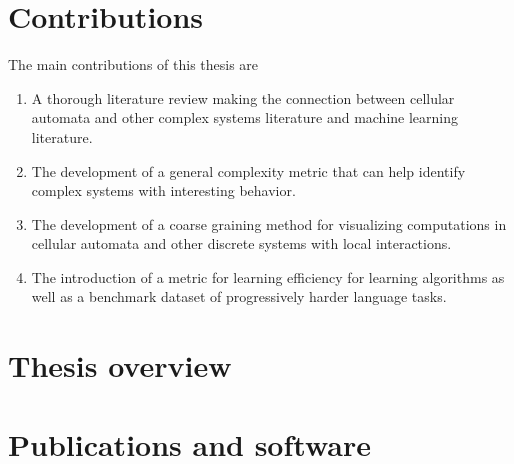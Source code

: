 \section{Contributions}

The main contributions of this thesis are
\begin{enumerate}
  \item A thorough literature review making the connection between cellular
        automata and other complex systems literature and machine learning
        literature.

  \item The development of a general complexity metric that can help identify
  complex systems with interesting behavior.

  \item The development of a coarse graining method for visualizing computations
        in cellular automata and other discrete systems with local interactions.

  \item The introduction of a metric for learning efficiency for learning
        algorithms as well as a benchmark dataset of progressively harder
        language tasks.
\end{enumerate}

\section{Thesis overview}

\section{Publications and software}

